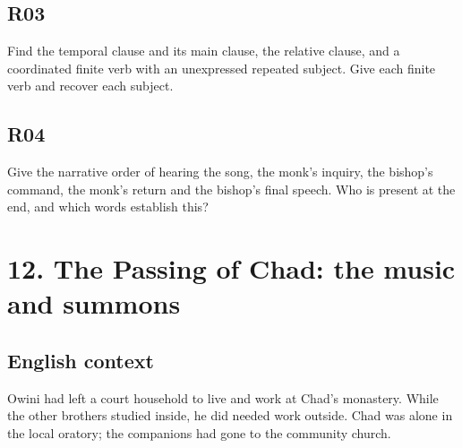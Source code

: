 \par\begin{minipage}{\linewidth}\raggedright
\subsection*{R03}

Find the temporal clause and its main clause, the relative clause, and a coordinated finite verb with an unexpressed repeated subject. Give each finite verb and recover each subject.

\end{minipage}\par\addvspace{4pt}

\par\begin{minipage}{\linewidth}\raggedright
\subsection*{R04}

Give the narrative order of hearing the song, the monk’s inquiry, the bishop’s command, the monk’s return and the bishop’s final speech. Who is present at the end, and which words establish this?

\end{minipage}\par\addvspace{4pt}

\section*{12. The Passing of Chad: the music and summons}

\subsection*{English context}

Owini had left a court household to live and work at Chad’s monastery. While the other brothers studied inside, he did needed work outside. Chad was alone in the local oratory; the companions had gone to the community church.

